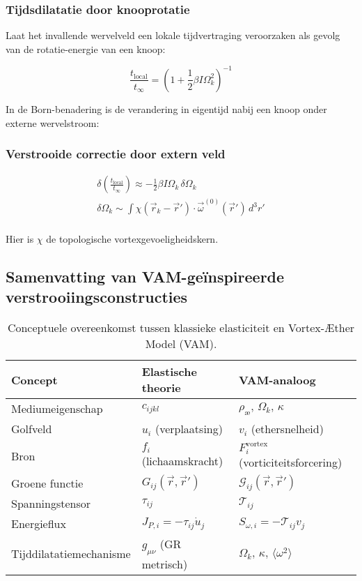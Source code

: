 \subsubsection*{Tijdsdilatatie door knooprotatie}

Laat het invallende wervelveld een lokale tijdvertraging veroorzaken als gevolg van de rotatie-energie van een knoop:

\[
\frac{t_{\text{local}}}{t_{\infty}} = \left(1 + \frac{1}{2} \beta I \Omega_k^2 \right)^{-1}
\]

In de Born-benadering is de verandering in eigentijd nabij een knoop onder externe wervelstroom:

\subsubsection*{Verstrooide correctie door extern veld}

\begin{gather*}
\delta \left( \frac{t_{\text{local}}}{t_{\infty}} \right) \approx - \frac{1}{2} \beta I \Omega_k \, \delta \Omega_k\\
\delta \Omega_k \sim \int \chi(\vec{r}_k - \vec{r}') \cdot \vec{\omega}^{(0)}(\vec{r}') \, d^3r'\\
\end{gather*}

Hier is \(\chi\) de topologische vortexgevoeligheidskern.

\subsection{Samenvatting van VAM-geïnspireerde verstrooiingsconstructies}

\begin{table}[htbp]
\centering
\begin{tabular}{lll}
\toprule
\textbf{Concept} & \textbf{Elastische theorie} & \textbf{VAM-analoog} \\
\midrule
Mediumeigenschap & \( c_{ijkl} \) & \( \rho_{\text{\ae}},\, \Omega_k,\, \kappa \) \\
Golfveld & \( u_i \) (verplaatsing) & \( v_i \) (ethersnelheid) \\
Bron & \( f_i \) (lichaamskracht) & \( F_i^{\text{vortex}} \) (vorticiteitsforcering) \\
Groene functie & \( G_{ij}(\vec{r}, \vec{r}') \) & \( \mathcal{G}_{ij}(\vec{r}, \vec{r}') \) \\
Spanningstensor & \( \tau_{ij} \) & \( \mathcal{T}_{ij} \) \\
Energieflux & \( J_{P,i} = -\tau_{ij} \dot{u}_j \) & \( S_{\omega,i} = -\mathcal{T}_{ij} v_j \) \\
Tijddilatatiemechanisme & \( g_{\mu\nu} \) (GR metrisch) & \( \Omega_k,\, \kappa,\, \langle \omega^2 \rangle \) \\
\bottomrule
\end{tabular}
\caption{Conceptuele overeenkomst tussen klassieke elasticiteit en Vortex-Æther Model (VAM).}
\label{tab:elastic-vam-analogy}
\end{table}

